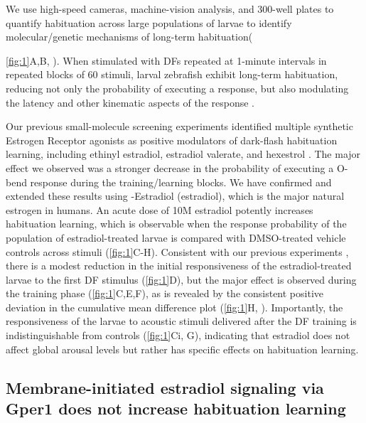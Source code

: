 \documentclass[9pt,lineno]{RandlettLab_elife}
\begin{document}
We use high-speed cameras, machine-vision analysis, and 300-well plates to quantify habituation across large populations of larvae to identify molecular/genetic mechanisms of long-term habituation({\autoref{fig:1}A,B, \citealp{Randlett2019-fj,Lamire2023-he}). 
When stimulated with DFs repeated at 1-minute intervals in repeated blocks of 60 stimuli, larval zebrafish exhibit long-term habituation, reducing not only the probability of executing a response, but also modulating the latency and other kinematic aspects of the response \citep{Randlett2019-fj}.  

Our previous small-molecule screening experiments identified multiple synthetic Estrogen Receptor agonists as positive modulators of dark-flash habituation learning, including ethinyl estradiol, estradiol valerate, and hexestrol  \citep{Lamire2023-he}. 
The major effect we observed was a stronger decrease in the probability of executing a O-bend response during the training/learning blocks. 
We have confirmed and extended these results using \textbeta-Estradiol (estradiol), which is the major natural estrogen in humans. 
An acute dose of 10\textmu M estradiol potently increases habituation learning, which is observable when the response probability of the population of estradiol-treated larvae is compared with DMSO-treated vehicle controls across stimuli (\autoref{fig:1}C-H).
Consistent with our previous experiments \citep{Lamire2023-he}, there is a modest reduction in the initial responsiveness of the estradiol-treated larvae to the first DF stimulus (\autoref{fig:1}D), but the major effect is observed during the training phase (\autoref{fig:1}C,E,F), as is revealed by the consistent positive deviation in the cumulative mean difference plot (\autoref{fig:1}H, \citealp{Randlett2019-fj}).
Importantly, the responsiveness of the larvae to acoustic stimuli delivered after the DF training is indistinguishable from controls (\autoref{fig:1}Ci, G), indicating that estradiol does not affect global arousal levels but rather has specific effects on habituation learning. 


\subsection{Membrane-initiated estradiol signaling via Gper1 does not increase habituation learning}

}
\end{document}
